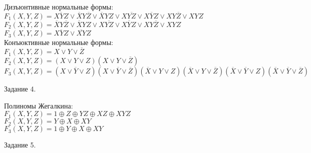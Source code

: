 \documentclass[a4paper,12pt]{report} %
\begin{document}
\begin{flushleft}
	Дизъюнтивные нормальные формы:\\
	$F_1(X,Y,Z)=\overline{XYZ} \vee \overline{X}Y\overline{Z} \vee \overline{X}YZ \vee X\overline{YZ} \vee X\overline{Y}Z \vee XY\overline{Z} \vee XYZ$\\
	$F_2(X,Y,Z)=\overline{X}Y\overline{Z} \vee \overline{X}YZ \vee X\overline{YZ} \vee X\overline{Y}Z \vee XY\overline{Z} \vee XYZ$\\
	$F_3(X,Y,Z)=\overline{XYZ} \vee \overline{XY}Z$\\
	\bigskip
	Конъюктивные нормальные формы:\\
	$F_1(X,Y,Z)=X \vee Y \vee \overline{Z}$\\
	$F_2(X,Y,Z)=(X\vee Y\vee Z)(X\vee Y\vee\overline{Z})$\\
	$F_3(X,Y,Z)=(X\vee \overline{Y}\vee Z)(X \vee \overline{Y} \vee \overline{Z})(\overline{X} \vee Y \vee Z)(\overline{X} \vee Y \vee \overline{Z})(\overline{X} \vee \overline{Y} \vee Z)(\overline{X} \vee \overline{Y} \vee \overline{Z})$\\
\end{flushleft}

\bigskip


\begin{center}
	Задание 4.\\
\end{center}

\begin{flushleft}
	Полиномы Жегалкина:\\
	$F_1(X,Y,Z)=1 \oplus Z \oplus YZ \oplus XZ \oplus XYZ$\\
	$F_2(X,Y,Z)=Y \oplus X \oplus XY$\\
	$F_3(X,Y,Z)=1 \oplus Y \oplus X \oplus XY$\\
\end{flushleft}

\bigskip

\begin{center}
	Задание 5.\\
\end{center}
\end{document}
